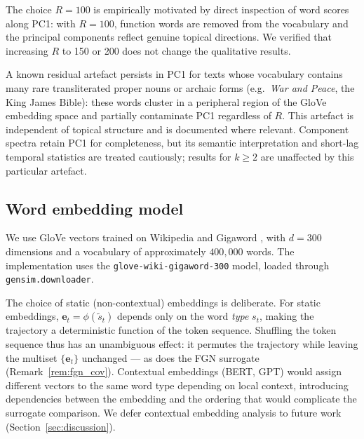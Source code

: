 \documentclass[preprint]{elsarticle}
\newcommand{\et}{\mathbf{e}_t}
\begin{document}
The choice $R = 100$ is empirically motivated by direct inspection of
word scores along PC1: with $R = 100$, function words are removed
from the vocabulary and the principal components reflect genuine
topical directions.
We verified that increasing $R$ to 150 or 200 does not change the
qualitative results.


A known residual artefact persists in PC1 for texts whose vocabulary
contains many rare transliterated proper nouns or archaic forms
(e.g.\ \emph{War and Peace}, the King James Bible): these words
cluster in a peripheral region of the GloVe embedding space and
partially contaminate PC1 regardless of $R$.
This artefact is independent of topical structure and is documented
where relevant. Component spectra retain PC1 for completeness, but its
semantic interpretation and short-lag temporal statistics are treated
cautiously; results for $k \geq 2$ are unaffected by this particular
artefact.

\subsection{Word embedding model}
\label{sec:embedding}

We use GloVe vectors trained on Wikipedia and Gigaword
\citep{Pennington2014}, with $d = 300$ dimensions and a vocabulary of
approximately $400{,}000$ words. The implementation uses the
\texttt{glove-wiki-\allowbreak gigaword-300} model, loaded through
\texttt{gensim.\allowbreak downloader}.

The choice of static (non-contextual) embeddings is deliberate.
For static embeddings, $\et = \phi(\tilde s_t)$ depends only on the word
\emph{type} $s_t$, making the trajectory a deterministic function of
the token sequence.
Shuffling the token sequence thus has an unambiguous effect: it
permutes the trajectory while leaving the multiset $\{\et\}$ unchanged
--- as does the FGN surrogate (Remark~\ref{rem:fgn_cov}).
Contextual embeddings (BERT, GPT) would assign different vectors to
the same word type depending on local context, introducing dependencies
between the embedding and the ordering that would complicate the
surrogate comparison.
We defer contextual embedding analysis to future work
(Section~\ref{sec:discussion}).
\end{document}
